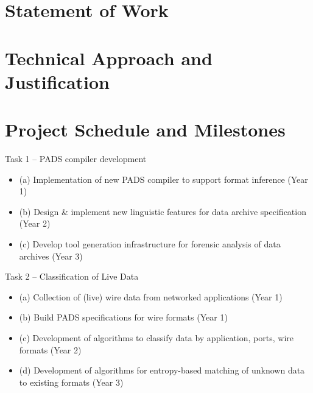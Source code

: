 \documentclass[12pt]{article}
\begin{document}
\section{Statement of Work}



\newpage

\section{Technical Approach and Justification}











%

%

%

%

%



\section{Project Schedule and Milestones}

Task 1 -- PADS compiler development
\begin{itemize}
\item (a) Implementation of new PADS compiler to support format inference (Year 1)
\item (b) Design \& implement new linguistic features for data archive specification (Year 2)
\item (c) Develop tool generation infrastructure for forensic analysis of data archives (Year 3)
\end{itemize}

\noindent
Task 2 -- Classification of Live Data
\begin{itemize}
\item (a) Collection of (live) wire data from networked applications (Year 1)
\item (b) Build PADS specifications for wire formats (Year 1)
\item (c) Development of algorithms to classify data by application, ports, wire formats (Year 2)
\item (d) Development of algorithms for entropy-based matching of unknown data to existing formats (Year 3)
\end{itemize}
\end{document}
